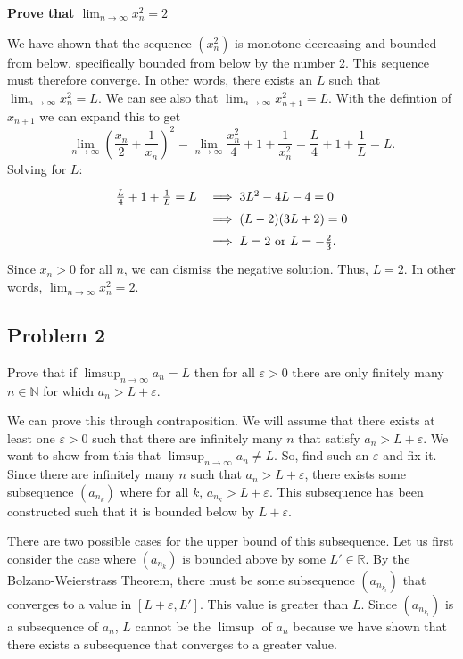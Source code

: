 \documentclass[11pt]{article}
\newcommand{\N}{\mathbb{N}}
\newcommand{\R}{\mathbb{R}}
\begin{document}
\textbf{Prove that $\displaystyle{\lim_{n\to\infty}x_n^2 = 2}$}

We have shown that the sequence $(x_n^2)$ is monotone decreasing
and bounded from below, specifically bounded from below by the number 2.
This sequence must therefore converge. In other words,
there exists an $L$ such that $\lim_{n\to\infty}x_n^2=L$. 
We can see also that $\lim_{n\to\infty}x_{n+1}^2=L$.
With the defintion of $x_{n+1}$ we can expand this to get 
\[\lim_{n\to\infty}\left(\frac{x_n}{2}+\frac{1}{x_n}\right)^2=
\lim_{n\to\infty}\frac{x_n^2}{4}+1+\frac{1}{x_n^2}=
\frac{L}{4}+1+\frac{1}{L}
=L.\]
Solving for $L$:
\[
\def\arraystretch{1.5}
\begin{array}{rl}
\frac{L}{4}+1+\frac{1}{L}=L &\implies 3L^2-4L-4=0 \\
&\implies (L-2)(3L+2)=0 \\
&\implies L=2 \textrm{ or } L=-\frac{2}{3}.
\end{array}
\]
Since $x_n > 0$ for all $n$, we can dismiss the negative solution. Thus,
$L=2$. In other words, $\lim_{n\to\infty}x_n^2=2$.

\subsection*{Problem 2}

Prove that if $\limsup_{n\to\infty}a_n=L$ then for all $\varepsilon>0$ there
are only finitely many $n\in\N$ for which $a_n>L+\varepsilon$.

We can prove this through contraposition. We will assume that there exists
at least one $\varepsilon>0$ such that there are infinitely many
$n$ that satisfy $a_n>L+\varepsilon$. We want to show from this that
$\limsup_{n\to\infty}a_n\neq L$. So, find such an $\varepsilon$ and fix it.
Since there are infinitely many $n$ such that $a_n>L+\varepsilon$, there exists
some subsequence $(a_{n_k})$ where for all $k$, $a_{n_k} > L+\varepsilon$.
This subsequence has been constructed such that it is bounded below by $L+\varepsilon$.

There are two possible cases for the upper bound of this subsequence. Let us first
consider the case where $(a_{n_k})$ is bounded above by some $L'\in\R$. By
the Bolzano-Weierstrass Theorem, there must be some subsequence
$(a_{n_{k_l}})$ that converges to a value in $[L+\varepsilon,L']$. This value
is greater than $L$. Since $(a_{n_{k_l}})$ is a subsequence of $a_n$, $L$ cannot
be the $\limsup$ of $a_n$ because we have shown that there exists a subsequence that
converges to a greater value.
\end{document}
